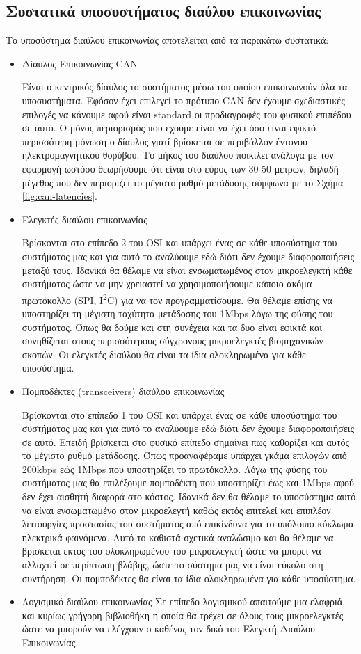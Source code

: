\documentclass{article}
\begin{document}
\subsection{Συστατικά υποσυστήματος διαύλου επικοινωνίας}
Το υποσύστημα διαύλου επικοινωνίας αποτελείται από τα παρακάτω συστατικά:
\begin{itemize}
    \item Δίαυλος Επικοινωνίας CAN
    \par
    Είναι ο κεντρικός δίαυλος το συστήματος μέσω του οποίου επικοινωνούν όλα τα υποσυστήματα. Εφόσον έχει επιλεγεί το πρότυπο CAN δεν έχουμε σχεδιαστικές επιλογές να κάνουμε αφού είναι standard οι προδιαγραφές του φυσικού επιπέδου σε αυτό. Ο μόνος περιορισμός που έχουμε είναι να έχει όσο είναι εφικτό περισσότερη μόνωση ο δίαυλος γιατί βρίσκεται σε περιβάλλον έντονου ηλεκτρομαγνητικού θορύβου. Το μήκος του διαύλου ποικίλει ανάλογα με τον εφαρμογή ωστόσο θεωρήσουμε ότι είναι στο εύρος των 30-50 μέτρων, δηλαδή μέγεθος που δεν περιορίζει το μέγιστο ρυθμό μετάδοσης σύμφωνα με το Σχήμα \ref{fig:can-latencies}.
    \item Ελεγκτές διαύλου επικοινωνίας
    \par
    Βρίσκονται στο επίπεδο 2 του OSI και υπάρχει ένας σε κάθε υποσύστημα του συστήματος μας και για αυτό το αναλύουμε εδώ διότι δεν έχουμε διαφοροποιήσεις μεταξύ τους. Ιδανικά θα θέλαμε να είναι ενσωματωμένος στον μικροελεγκτή κάθε συστήματος ώστε να μην χρειαστεί να χρησιμοποιήσουμε κάποιο ακόμα πρωτόκολλο (SPI, I\textsuperscript{2}C) για να τον προγραμματίσουμε. Θα θέλαμε επίσης να υποστηρίζει τη μέγιστη ταχύτητα μετάδοσης του 1Mbps λόγω της φύσης του συστήματος. Όπως θα δούμε και στη συνέχεια και τα δυο είναι εφικτά και συνηθίζεται στους περισσότερους σύγχρονους μικροελεγκτές βιομηχανικών σκοπών. Οι ελεγκτές διαύλου θα είναι τα ίδια ολοκληρωμένα για κάθε υποσύστημα.
    \item Πομποδέκτες (transceivers) διαύλου επικοινωνίας
    \par
    Βρίσκονται στο επίπεδο 1 του OSI και υπάρχει ένας σε κάθε υποσύστημα του συστήματος μας και για αυτό το αναλύουμε εδώ διότι δεν έχουμε διαφοροποιήσεις σε αυτό. Επειδή βρίσκεται στο φυσικό επίπεδο σημαίνει πως καθορίζει και αυτός το μέγιστο ρυθμό μετάδοσης. Όπως προαναφέραμε υπάρχει γκάμα επιλογών από 200kbps εώς 1Mbps που υποστηρίζει το πρωτόκολλο. Λόγω της φύσης του συστήματος μας θα επιλέξουμε πομποδέκτη που υποστηρίζει έως και 1Mbps αφού δεν έχει αισθητή διαφορά στο κόστος. Ιδανικά δεν θα θέλαμε το υποσύστημα αυτό να είναι ενσωματωμένο στον μικροελεγτή καθώς εκτός επιτελεί και επιπλέον λειτουργίες προστασίας του συστήματος από επικίνδυνα για το υπόλοιπο κύκλωμα ηλεκτρικά φαινόμενα. Αυτό το καθιστά σχετικά αναλώσιμο και θα θέλαμε να βρίσκεται εκτός του ολοκληρωμένου του μικροελεγκτή ώστε να μπορεί να αλλαχτεί σε περίπτωση βλάβης, ώστε το σύστημα μας να είναι εύκολο στη συντήρηση. Οι πομποδέκτες θα είναι τα ίδια ολοκληρωμένα για κάθε υποσύστημα.
    \item Λογισμικό διαύλου επικοινωνίας
    Σε επίπεδο λογισμικού απαιτούμε μια ελαφριά και κυρίως γρήγορη βιβλιοθήκη η οποία θα τρέχει σε όλους τους μικροελεγκτές ώστε να μπορούν να ελέγχουν ο καθένας τον δικό του Ελεγκτή Διαύλου Επικοινωνίας. 
\end{itemize}
\end{document}
